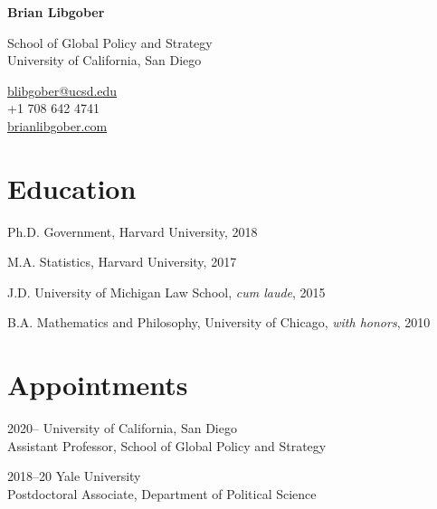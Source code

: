 \documentclass[12pt,letterpaper]{report}
\newcommand{\myname}{Brian Libgober}
\newcommand{\namefont}[1]{{\normalfont\bfseries\Huge{#1}}}
\begin{document}
    \raggedright{}

    \namefont{\myname}

    \vspace{1em}
    \begin{minipage}[t]{0.700\textwidth}
        School of Global Policy and Strategy \\
        University of California, San Diego
    \end{minipage}
    \begin{minipage}[t]{0.295\textwidth}
        \flushright{}
        \href{mailto:blibgober@ucsd.edu}{blibgober@ucsd.edu} \\
        +1 708 642 4741 \\
        \href{https://brianlibgober.com}{brianlibgober.com} \\
    \end{minipage}
    

    \section*{Education}

    \begin{tablist}

        \item[Ph.D.] \tab{}Government, Harvard University, 2018
        \item[M.A.]  \tab{}Statistics, Harvard University, 2017
        \item[J.D.]  \tab{}University of Michigan Law School, \textit{cum laude}, 2015
        \item[B.A.]  \tab{}Mathematics and Philosophy, University of Chicago, \textit{with honors}, 2010

    \end{tablist}

    \section*{Appointments}

    \begin{tablist}

        \item[2020--]   \tab{}University of California, San Diego \\
                             Assistant Professor, School of Global Policy and Strategy

        \item[2018--20] \tab{}Yale University \\
                             Postdoctoral Associate, Department of Political Science \\ 

    \end{tablist}
\end{document}
